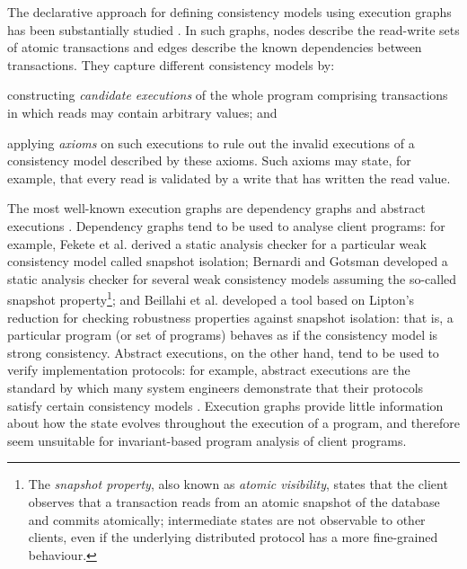 The declarative approach for defining 
consistency models using execution graphs has been substantially
studied \cite{adya,ev_transactions,framework-concur,SIanalysis,laws}. 
In such graphs,  nodes  describe the read-write sets of  atomic transactions and edges describe the
known dependencies between transactions.
They capture different consistency models by:
\begin{enumerate*}
\item constructing  \emph{candidate executions} of the whole program comprising
transactions in which reads may contain arbitrary values; and 
\item applying  \emph{axioms}  on such executions to
  rule out the invalid executions of 
a consistency model described  by
  these axioms. 
Such axioms may state, for example, that every read is
validated by a write that has written the read value. 
\end{enumerate*}
The most well-known execution graphs are dependency graphs \cite{adya} and abstract
executions \cite{ev_transactions,framework-concur}. 
Dependency graphs tend to be used to analyse  client programs: for
example, 
Fekete et al. \citet{fekete-tods} derived 
a static analysis checker for a particular weak consistency model called
snapshot isolation;  Bernardi and Gotsman \citet{giovanni_concur16}
developed a static analysis checker for several weak consistency
models assuming the so-called snapshot property\footnote{The \emph{snapshot property}, 
also known as \emph{atomic visibility}, states that
the client observes that a transaction reads from an atomic snapshot
of the database and commits atomically;  intermediate states are not observable to other clients, 
even if the underlying distributed protocol has a more fine-grained behaviour.}; and 
Beillahi et al. \citep{snapshot-isolation-robust-tool} developed a tool based on Lipton's reduction \cite{Lipton-reduction}
for checking robustness properties against snapshot isolation: 
that is, a  particular program (or set of programs) behaves as if the consistency model is strong consistency. 
Abstract executions, on the other hand, tend to be used to verify  implementation protocols: for example,
abstract executions are the  standard by which many system engineers
demonstrate that their protocols satisfy  certain
consistency models \cite{cops,NMSI,PSI}. 
Execution graphs provide little information about how the 
state evolves throughout the execution of a program, and 
therefore seem  unsuitable for invariant-based program analysis 
of client programs. 


